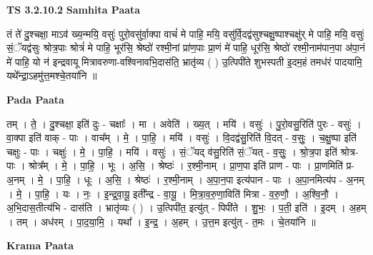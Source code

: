 \documentclass[17pt]{extarticle}
\begin{document}
\textbf{TS 3.2.10.2 } \newline
\textbf{Samhita Paata} \newline

तं ते॑ दु॒श्चक्षा॒ माऽव॑ ख्य॒न्मयि॒ वसुः॑ पुरो॒वसु॑र्वा॒क्पा वाचं॑ मे पाहि॒ मयि॒ वसु॑र्वि॒दद्व॑सुश्चक्षु॒ष्पाश्चक्षु॑र् मे पाहि॒ मयि॒ वसुः॑ सं॒ॅयद्व॑सुः श्रोत्र॒पाः श्रोत्रं॑ मे पाहि॒ भूर॑सि॒ श्रेष्ठो॑ रश्मी॒नां प्रा॑ण॒पाः प्रा॒णं मे॑ पाहि॒ धूर॑सि॒ श्रेष्ठो॑ रश्मी॒नाम॑पान॒पा अ॑पा॒नं मे॑ पाहि॒ यो न॑ इन्द्रवायू मित्रावरुणा-वश्विनावभि॒दास॑ति॒ भ्रातृ॑व्य ( ) उ॒त्पिपी॑ते शुभस्पती इ॒दम॒हं तमध॑रं पादयामि॒ यथे᳚न्द्रा॒ऽहमु॑त्त॒मश्चे॒तया॑नि ॥ \newline

\textbf{Pada Paata} \newline

तम् । ते॒ । दु॒श्चक्षा॒ इति॑ दुः - चक्षाः᳚ । मा । अवेति॑ । ख्य॒त् । मयि॑ । वसुः॑ । पु॒रो॒वसु॒रिति॑ पुरः - वसुः॑ । वा॒क्पा इति॑ वाक् - पाः । वाच᳚म् । मे॒ । पा॒हि॒ । मयि॑ । वसुः॑ । वि॒दद्व॑सु॒रिति॑ वि॒दत् - व॒सुः॒ । च॒क्षु॒ष्पा इति॑ चक्षुः - पाः । चक्षुः॑ । मे॒ । पा॒हि॒ । मयि॑ । वसुः॑ । सं॒ॅयद् व॑सु॒रिति॑ सं॒ॅयत् - व॒सुः॒ । श्रो॒त्र॒पा इति॑ श्रोत्र-पाः । श्रोत्र᳚म् । मे॒ । पा॒हि॒ । भूः । अ॒सि॒ । श्रेष्ठः॑ । र॒श्मी॒नाम् । प्रा॒ण॒पा इति॑ प्राण - पाः । प्रा॒णमिति॑ प्र- अ॒नम् । मे॒ । पा॒हि॒ । धूः । अ॒सि॒ । श्रेष्ठः॑ । र॒श्मी॒नाम् । अ॒पा॒न॒पा इत्य॑पान - पाः । अ॒पा॒नमित्य॑प - अ॒नम् । मे॒ । पा॒हि॒ । यः । नः॒ । इ॒न्द्र॒वा॒यू॒ इती᳚न्द्र - वा॒यू॒ । मि॒त्रा॒व॒रु॒णा॒विति॑ मित्रा - व॒रु॒णौ॒ । अ॒श्वि॒नौ॒ । अ॒भि॒दास॒तीत्य॑भि - दास॑ति । भ्रातृ॑व्यः ( ) । उ॒त्पिपी॑त॒ इत्यु॑त् - पिपी॑ते । शु॒भः॒ । प॒ती॒ इति॑ । इ॒दम् । अ॒हम् । तम् । अध॑रम् । पा॒द॒या॒मि॒ । यथा᳚ । इ॒न्द्र॒ । अ॒हम् । उ॒त्त॒म इत्यु॑त् - त॒मः । चे॒तया॑नि ॥  \newline


\textbf{Krama Paata} \newline
\end{document}
